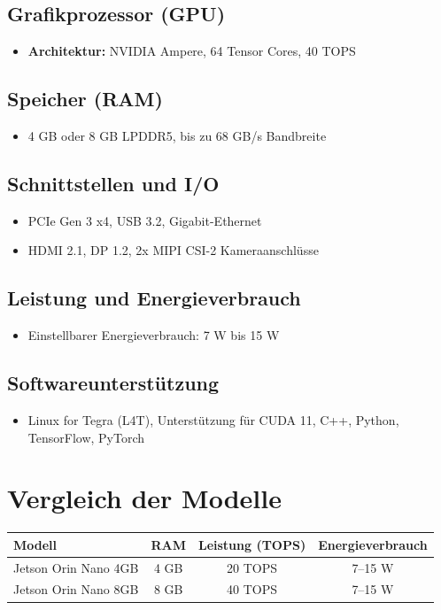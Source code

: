 \documentclass{article}
\begin{document}
\subsection{Grafikprozessor (GPU)}
\begin{itemize}
    \item \textbf{Architektur:} NVIDIA Ampere, 64 Tensor Cores, 40 TOPS
\end{itemize}

\subsection{Speicher (RAM)}
\begin{itemize}
    \item 4 GB oder 8 GB LPDDR5, bis zu 68 GB/s Bandbreite
\end{itemize}

\subsection{Schnittstellen und I/O}
\begin{itemize}
    \item PCIe Gen 3 x4, USB 3.2, Gigabit-Ethernet
    \item HDMI 2.1, DP 1.2, 2x MIPI CSI-2 Kameraanschlüsse
\end{itemize}

\subsection{Leistung und Energieverbrauch}
\begin{itemize}
    \item Einstellbarer Energieverbrauch: 7 W bis 15 W
\end{itemize}

\subsection{Softwareunterstützung}
\begin{itemize}
    \item Linux for Tegra (L4T), Unterstützung für CUDA 11, C++, Python, TensorFlow, PyTorch
\end{itemize}

\section{Vergleich der Modelle}

\begin{longtable}{|l|c|c|c|}
    \hline
    \textbf{Modell} & \textbf{RAM} & \textbf{Leistung (TOPS)} & \textbf{Energieverbrauch} \\
    \hline
    Jetson Orin Nano 4GB & 4 GB & 20 TOPS & 7–15 W \\
    Jetson Orin Nano 8GB & 8 GB & 40 TOPS & 7–15 W \\
    \hline
\end{longtable}
\end{document}

